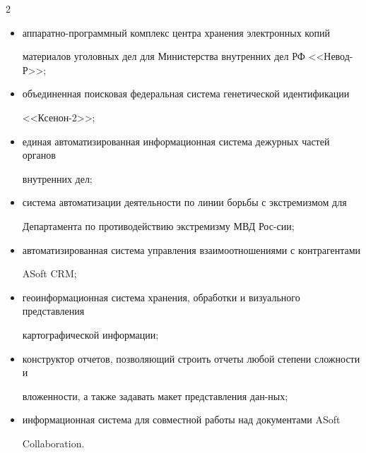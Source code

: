 \begin{multicols}{2}
\begin{itemize}

\item аппаратно-программный комплекс центра хранения электронных копий 

материалов уголовных дел для Министерства внутренних дел РФ <<Невод-Р>>;

\item объединенная поисковая федеральная система генетической идентификации 

<<Ксенон-2>>;

\item единая автоматизированная информационная система дежурных частей органов 

внутренних дел;\\[-5pt]

\item система автоматизации деятельности по линии борьбы с экстремизмом для 

Департамента по противодействию экстремизму МВД Рос-\linebreak сии;\\[-5pt]

\item автоматизированная система управления взаимоотношениями с контрагентами 

ASoft CRM;\\[-5pt]

\item геоинформационная система хранения, обработки и визуального представления 

картографической информации;\\[-5pt]

\item конструктор отчетов, позволяющий строить отчеты любой степени сложности и 

вложенности, а также задавать макет представления дан-\linebreak ных;\\[-5pt]

\item информационная система для совместной работы над документами ASoft 

Collaboration.

\end{itemize}



{\small\frenchspacing

{%


}}
\end{multicols}
